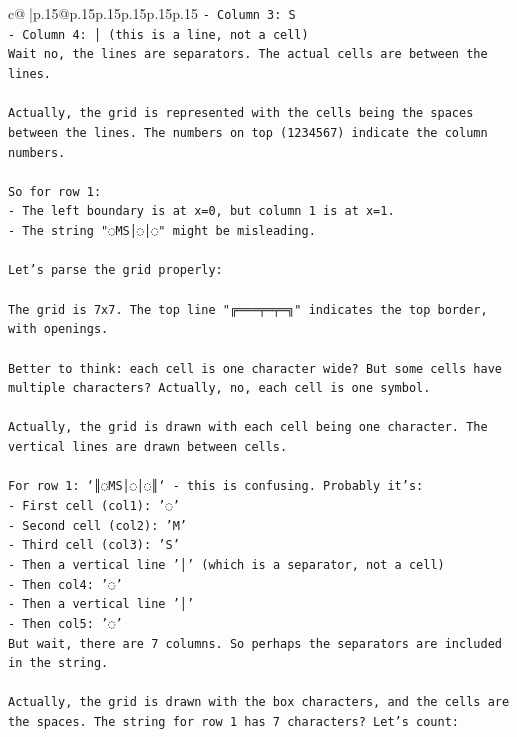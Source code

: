 \documentclass{article}
\begin{document}
{\begin{supertabular}{c@{$\;$}|p{.15\linewidth}@{}p{.15\linewidth}p{.15\linewidth}p{.15\linewidth}p{.15\linewidth}p{.15\linewidth}}
{{{\texttt{{-} Column 3: S} \\
\texttt{{-} Column 4: │ (this is a line, not a cell)} \\
\texttt{Wait no, the lines are separators. The actual cells are between the lines.} \\
\\ 
\texttt{Actually, the grid is represented with the cells being the spaces between the lines. The numbers on top (1234567) indicate the column numbers.} \\
\\ 
\texttt{So for row 1:} \\
\texttt{{-} The left boundary is at x=0, but column 1 is at x=1.} \\
\texttt{{-} The string "◌MS│◌│◌" might be misleading.} \\
\\ 
\texttt{Let's parse the grid properly:} \\
\\ 
\texttt{The grid is 7x7. The top line "╔═══╤═╤═╗" indicates the top border, with openings.} \\
\\ 
\texttt{Better to think: each cell is one character wide? But some cells have multiple characters? Actually, no, each cell is one symbol.} \\
\\ 
\texttt{Actually, the grid is drawn with each cell being one character. The vertical lines are drawn between cells.} \\
\\ 
\texttt{For row 1: `║◌MS│◌│◌║` {-} this is confusing. Probably it's:} \\
\texttt{{-} First cell (col1): '◌'} \\
\texttt{{-} Second cell (col2): 'M'} \\
\texttt{{-} Third cell (col3): 'S'} \\
\texttt{{-} Then a vertical line '│' (which is a separator, not a cell)} \\
\texttt{{-} Then col4: '◌'} \\
\texttt{{-} Then a vertical line '│'} \\
\texttt{{-} Then col5: '◌'} \\
\texttt{But wait, there are 7 columns. So perhaps the separators are included in the string.} \\
\\ 
\texttt{Actually, the grid is drawn with the box characters, and the cells are the spaces. The string for row 1 has 7 characters? Let's count:} \\
}}}
\end{supertabular}}
\end{document}
